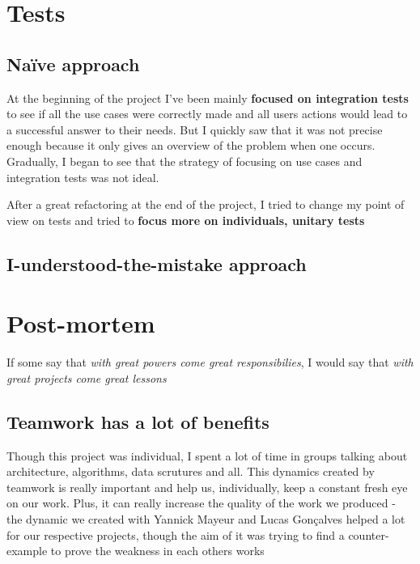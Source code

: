 \documentclass[11pt]{article}
\begin{document}

\section{Tests}
\subsection{Naïve approach}
At the beginning of the project I've been mainly \textbf{focused on integration tests} to see if all the use cases were correctly made and all users actions would lead to a successful answer to their needs. But I quickly saw that it was not precise enough because it only gives an overview of the problem when one occurs. Gradually, I began to see that the strategy of focusing on use cases and integration tests was not ideal.

After a great refactoring at the end of the project, I tried to change my point of view on tests and tried to \textbf{focus more on individuals, unitary tests}




\subsection{I-understood-the-mistake approach}

\section{Post-mortem}
If some say that \textit{with great powers come great responsibilies}, I would say that \textit{with great projects come great lessons}

\subsection{Teamwork has a lot of benefits}
Though this project was individual, I spent a lot of time in groups talking about architecture, algorithms, data scrutures and all. This dynamics created by teamwork is really important and help us, individually, keep a constant fresh eye on our work. Plus, it can really increase the quality of the work we produced - the dynamic we created with Yannick Mayeur and Lucas Gonçalves helped a lot for our respective projects, though the aim of it was trying to find a counter-example to prove the weakness in each others works
\end{document}
